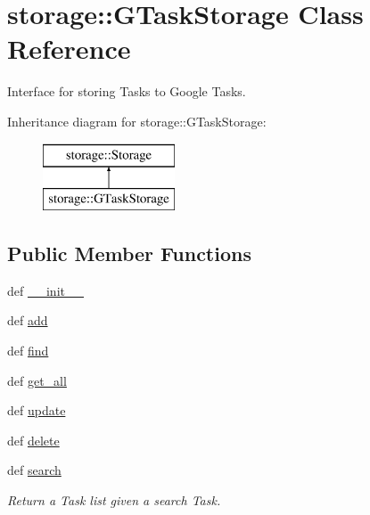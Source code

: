 \hypertarget{classstorage_1_1GTaskStorage}{
\section{storage\-:\-:\-G\-Task\-Storage \-Class \-Reference}
\label{classstorage_1_1GTaskStorage}
}


\-Interface for storing \-Tasks to \-Google \-Tasks.  


\-Inheritance diagram for storage\-:\-:\-G\-Task\-Storage\-:\begin{figure}[H]
\begin{center}
\leavevmode
\includegraphics[height=2.000000cm]{classstorage_1_1GTaskStorage}
\end{center}
\end{figure}
\subsection*{\-Public \-Member \-Functions}
\begin{DoxyCompactItemize}
\item 
def \hyperlink{classstorage_1_1GTaskStorage_af3ffb72b776e8710e4e8b21e0332e5aa}{\-\_\-\-\_\-init\-\_\-\-\_\-}
\item 
def \hyperlink{classstorage_1_1GTaskStorage_a72ab709717d8de24f98ac7bad49e2df7}{add}
\item 
def \hyperlink{classstorage_1_1GTaskStorage_a618c0ae51a54f156dee09ecafef8d1a0}{find}
\item 
def \hyperlink{classstorage_1_1GTaskStorage_a7babf14f4d14119f9c8230d91b37ef79}{get\-\_\-all}
\item 
def \hyperlink{classstorage_1_1GTaskStorage_acc41c8c0e63a97bd2093efc542d92b1a}{update}
\item 
def \hyperlink{classstorage_1_1GTaskStorage_a6a5ecc4bf9ea5604baaf29b98d6cf311}{delete}
\item 
def \hyperlink{classstorage_1_1GTaskStorage_a1d112c05463018ea6dfa3eea65196fd6}{search}
\begin{DoxyCompactList}\small\item\em \-Return a \-Task list given a search \-Task. \end{DoxyCompactList}\end{DoxyCompactItemize}
